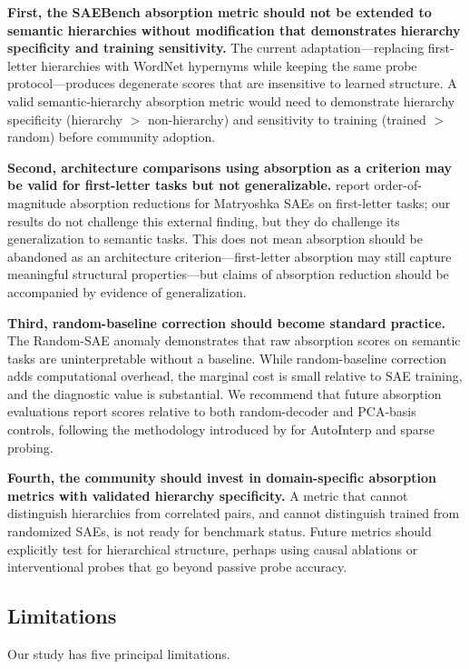 \documentclass{article}
\begin{document}
\textbf{First, the SAEBench absorption metric should not be extended to semantic hierarchies without modification that demonstrates hierarchy specificity and training sensitivity.} The current adaptation---replacing first-letter hierarchies with WordNet hypernyms while keeping the same probe protocol---produces degenerate scores that are insensitive to learned structure. A valid semantic-hierarchy absorption metric would need to demonstrate hierarchy specificity (hierarchy $>$ non-hierarchy) and sensitivity to training (trained $>$ random) before community adoption.

\textbf{Second, architecture comparisons using absorption as a criterion may be valid for first-letter tasks but not generalizable.} \citet{bussmann2025matryoshka} report order-of-magnitude absorption reductions for Matryoshka SAEs on first-letter tasks; our results do not challenge this external finding, but they do challenge its generalization to semantic tasks. This does not mean absorption should be abandoned as an architecture criterion---first-letter absorption may still capture meaningful structural properties---but claims of absorption reduction should be accompanied by evidence of generalization.

\textbf{Third, random-baseline correction should become standard practice.} The Random-SAE anomaly demonstrates that raw absorption scores on semantic tasks are uninterpretable without a baseline. While random-baseline correction adds computational overhead, the marginal cost is small relative to SAE training, and the diagnostic value is substantial. We recommend that future absorption evaluations report scores relative to both random-decoder and PCA-basis controls, following the methodology introduced by \citet{korznikov2025ortsae} for AutoInterp and sparse probing.

\textbf{Fourth, the community should invest in domain-specific absorption metrics with validated hierarchy specificity.} A metric that cannot distinguish hierarchies from correlated pairs, and cannot distinguish trained from randomized SAEs, is not ready for benchmark status. Future metrics should explicitly test for hierarchical structure, perhaps using causal ablations or interventional probes that go beyond passive probe accuracy.

\subsection{Limitations}

Our study has five principal limitations.
\end{document}
